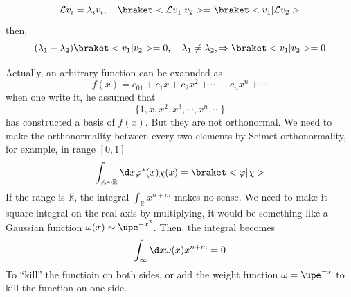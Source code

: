 \begin{solution}[By TA]
\begin{enumext}
    \[
      \mathcal Lv_i = \lambda_i v_i, \quad
      \braket<\mathcal Lv_1|v_2> = \braket<v_1|\mathcal Lv_2>
    \]
    then,
    \[
      (\lambda_1 - \lambda_2)\braket<v_1|v_2> = 0, \quad
      \lambda_1 \neq \lambda_2,
      \Rightarrow \braket<v_1|v_2> = 0
    \]
  \end{enumext}
  \begin{remark}
    Actually, an arbitrary function can be exapnded as
    \[
      f(x) = c_01 + c_1 x + c_2 x^2 + \cdots + c_nx^n + \cdots
    \]
    when one write it, he assumed that
    \[
      \{1, x, x^2, x^3, \cdots, x^n, \cdots\}
    \]
    has constructed a basis of $f(x)$. But they are not orthonormal.
    We need to make the orthonormality between every two elements by
    Scimet orthonormality, for example, in range $[0,1]$
    \[
      \int_{A \sim \mathbb R} \d x \varphi^*(x) \chi(x) = \braket<\varphi|\chi>
    \]
    If the range is $\mathbb R$, the integral $\int_{\mathbb R} x^{n+m}$ makes
    no sense. We need to make it square integral on the real axis by
    multiplying, it would be something like a Gaussian function
    $\omega(x) \sim \upe^{-x^2}$. Then, the integral becomes
    \[
      \int_\infty \d x \omega(x) x^{n+m} = 0
    \]
    To ``kill'' the functioin on both sides, or add the weight function
    $\omega = \upe^{-x}$ to kill the function on one side.
  \end{remark}
\end{solution}
\begin{problem}
\end{problem}
